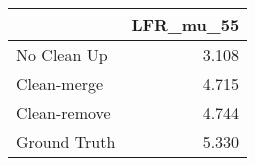 \begin{tabular}{lr}
\toprule
{} & LFR_mu_55 \\
\midrule
No Clean Up  &     3.108 \\
Clean-merge  &     4.715 \\
Clean-remove &     4.744 \\
Ground Truth &     5.330 \\
\bottomrule
\end{tabular}

